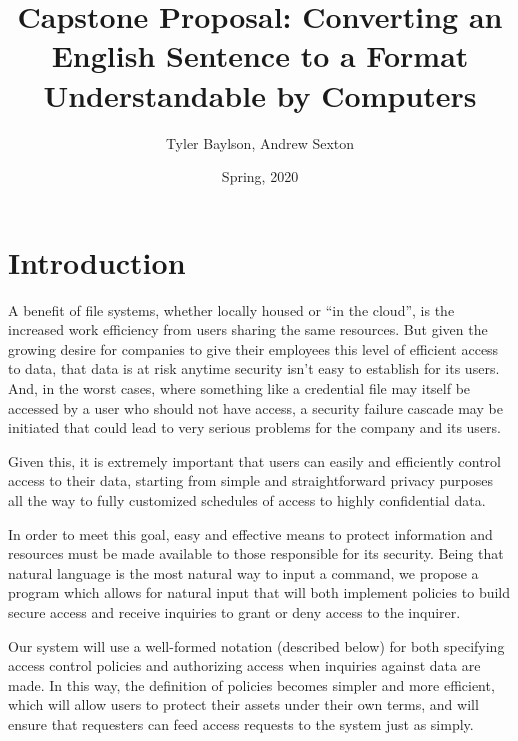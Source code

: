 \documentclass[12pt]{article}
\begin{document}

\title{Capstone Proposal: Converting an English Sentence to a Format Understandable by Computers}
\author{Tyler Baylson, Andrew Sexton}
\date{Spring, 2020}
\maketitle

\section{Introduction}
A benefit of file systems, whether locally housed or “in the cloud”, is the increased work efficiency from users sharing the same resources. But given the growing desire for companies to give their employees this level of efficient access to data, that data is at risk anytime security isn’t easy to establish for its users. And, in the worst cases, where something like a credential file may itself be accessed by a user who should not have access, a security failure cascade may be initiated that could lead to very serious problems for the company and its users.

Given this, it is extremely important that users can easily and efficiently control access to their data, starting from simple and straightforward privacy purposes all the way to fully customized schedules of access to highly confidential data.

In order to meet this goal, easy and effective means to protect information and resources must be made available to those responsible for its security. 
Being that natural language is the most natural way to input a command, we propose a program which allows for natural input that will both implement policies to build secure access and receive inquiries to grant or deny access to the inquirer.

Our system will use a well-formed notation (described below) for both specifying access control policies and authorizing access when inquiries against data are made. In this way, the definition of policies becomes simpler and more efficient, which will allow users to protect their assets under their own terms, and will ensure that requesters can feed access requests to the system just as simply.
\end{document}
